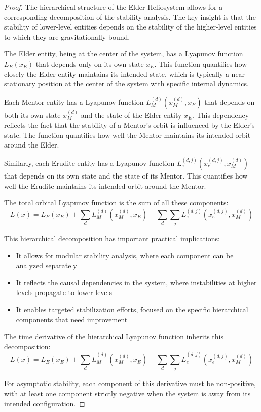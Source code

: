 \begin{proof}
The hierarchical structure of the Elder Heliosystem allows for a corresponding decomposition of the stability analysis. The key insight is that the stability of lower-level entities depends on the stability of the higher-level entities to which they are gravitationally bound.

The Elder entity, being at the center of the system, has a Lyapunov function $L_E(x_E)$ that depends only on its own state $x_E$. This function quantifies how closely the Elder entity maintains its intended state, which is typically a near-stationary position at the center of the system with specific internal dynamics.

Each Mentor entity has a Lyapunov function $L_M^{(d)}(x_M^{(d)}, x_E)$ that depends on both its own state $x_M^{(d)}$ and the state of the Elder entity $x_E$. This dependency reflects the fact that the stability of a Mentor's orbit is influenced by the Elder's state. The function quantifies how well the Mentor maintains its intended orbit around the Elder.

Similarly, each Erudite entity has a Lyapunov function $L_e^{(d,j)}(x_e^{(d,j)}, x_M^{(d)})$ that depends on its own state and the state of its Mentor. This quantifies how well the Erudite maintains its intended orbit around the Mentor.

The total orbital Lyapunov function is the sum of all these components:
\begin{equation}
L(x) = L_E(x_E) + \sum_d L_M^{(d)}(x_M^{(d)}, x_E) + \sum_d \sum_j L_e^{(d,j)}(x_e^{(d,j)}, x_M^{(d)})
\end{equation}

This hierarchical decomposition has important practical implications:
\begin{itemize}
    \item It allows for modular stability analysis, where each component can be analyzed separately
    \item It reflects the causal dependencies in the system, where instabilities at higher levels propagate to lower levels
    \item It enables targeted stabilization efforts, focused on the specific hierarchical components that need improvement
\end{itemize}

The time derivative of the hierarchical Lyapunov function inherits this decomposition:
\begin{equation}
\dot{L}(x) = \dot{L}_E(x_E) + \sum_d \dot{L}_M^{(d)}(x_M^{(d)}, x_E) + \sum_d \sum_j \dot{L}_e^{(d,j)}(x_e^{(d,j)}, x_M^{(d)})
\end{equation}

For asymptotic stability, each component of this derivative must be non-positive, with at least one component strictly negative when the system is away from its intended configuration.
\end{proof}

